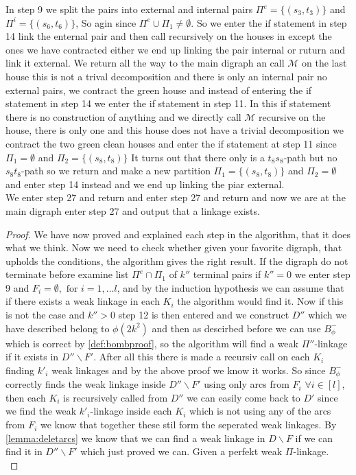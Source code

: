 \begin{example}
    In step 9 we split the pairs into external and internal pairs $\Pi^e=\lbrace(s_3,t_3)\rbrace$ and $\Pi^i=\lbrace (s_6,t_6)\rbrace$, So agin since $\Pi^e\cup \Pi_1\neq \emptyset$.
    So we enter the if statement in step 14 link the enternal pair and then call recursively on the houses in except the ones we have contracted either we end up linking the pair internal or ruturn and link it external. 
    We return all the way to the main digraph an call $\mathcal{M}$ on the last house this is not a trival decomposition and there is only an internal pair no external pairs, we contract the green house and instead of entering the if statement in step 14 we enter the if statement in step 11. 
    In this if statement there is no construction of anything and we directly call $\mathcal{M}$ recursive on the house, there is only one and this house does not have a trivial decomposition we contract the two green clean houses and enter the if statement at step 11 since $\Pi_1=\emptyset$ and $\Pi_2=\lbrace (s_8,t_8)\rbrace$   
    It turns out that there only is a $t_8s_8$-path but no $s_8t_8$-path so we return and make a new partition  $\Pi_1=\lbrace (s_8,t_8)\rbrace$ and $\Pi_2=\emptyset$ and enter step 14 instead and we end up linking the piar external. \\
    We enter step 27 and return and enter step 27 and return and now we are at the main digraph enter step 27 and output that a linkage exists. 
\end{example}
\begin{proof}
    We have now proved and explained each step in the algorithm, that it does what we think. 
    Now we need to check whether given your favorite digraph, that upholds the conditions, the algorithm gives the right result.
    If the digraph do not terminate before examine list $\Pi^e\cap \Pi_1$ of $k''$ terminal pairs if $k''=0$ we enter step 9 and $F_i=\emptyset, \text{ for } i=1,\dots l$, and by the induction hypothesis we can assume that if there exists a weak linkage in each $K_i$ the algorithm would find it. 
    Now if this is not the case and $k''>0$ step 12 is then entered and we construct $D''$ which we have described belong to $\phi(2k^2)$ and then as descirbed before we can use $B_\phi^-$ which is correct by \autoref{def:bombproof}, so the algorithm will find a weak $\Pi''$-linkage if it exists in $D''\backslash F'$. 
    After all this there is made a recursiv call on each $K_i$ finding $k'_i$ weak linkages and by the above proof we know it works. 
    So since $B_\phi^-$ correctly finds the weak linkage inside $D''\backslash F'$ using only arcs from $F_i$ $\forall i\in[l]$, then each $K_i$ is recursively called from $D''$ we can easily come back to $D'$ since we find the weak $k'_i$-linkage inside each $K_i$ which is not using any of the arcs from $F_i$ we know that together these stil form the seperated weak linkages.
    By \autoref{lemma:deletarcs} we know that we can find a weak linkage in $D\backslash F$ if we can find it in $D''\backslash F'$ which just proved we can. 
    Given a perfekt weak $\Pi$-linkage.\\
\end{proof}

